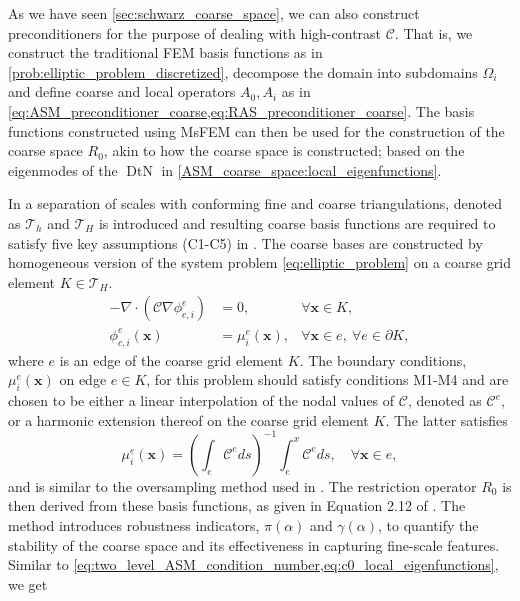 As we have seen \cref{sec:schwarz_coarse_space}, we can also construct preconditioners for the purpose of dealing with high-contrast $\mathcal{C}$. That is, we construct the traditional FEM basis functions as in \cref{prob:elliptic_problem_discretized}, decompose the domain into subdomains $\Omega_i$ and define coarse and local operators $A_0, A_i$ as in \cref{eq:ASM_preconditioner_coarse,eq:RAS_preconditioner_coarse}. The basis functions constructed using MsFEM can then be used for the construction of the coarse space $R_0$, akin to how the coarse space is constructed; based on the eigenmodes of the $\operatorname{DtN}$ in \cref{ASM_coarse_space:local_eigenfunctions}.

In \cite{msfem_coarse_space_Graham_2007,msfem_for_darcy_Efendiev2011} a separation of scales with conforming fine and coarse triangulations, denoted as $\mathcal{T}_h$ and $\mathcal{T}_H$ is introduced and resulting coarse basis functions are required to satisfy five key assumptions (C1-C5) in \cite[Section 2.2]{msfem_coarse_space_Graham_2007}. The coarse bases are constructed by homogeneous version of the system problem \cref{eq:elliptic_problem} on a coarse grid element $K\in\mathcal{T}_H$.
\begin{equation}
    \begin{aligned}
        -\nabla\cdot(\mathcal{C} \nabla \phi^e_{c,i}) & = 0,                   & \forall \mathbf{x} \in K,                             \\
        \phi^e_{c,i}(\mathbf{x})                      & = \mu^e_i(\mathbf{x}), & \forall \mathbf{x} \in e, \ \forall e \in \partial K,
    \end{aligned}
    \label{eq:msfem_coarse_basis}
\end{equation}
where $e$ is an edge of the coarse grid element $K$. The boundary conditions, $\mu^e_i(\mathbf{x})$ on edge $e\in K$, for this problem should satisfy conditions M1-M4 \cite[Section 4]{msfem_coarse_space_Graham_2007} and are chosen to be either a linear interpolation of the nodal values of $\mathcal{C}$, denoted as $\mathcal{C}^e$, or a harmonic extension thereof on the coarse grid element $K$. The latter satisfies
\begin{equation}
    \mu^e_i(\mathbf{x}) = \left(\int_e \mathcal{C}^e ds\right)^{-1}\int_e^x \mathcal{C}^e ds, \quad \forall \mathbf{x} \in e,
    \label{eq:msfem_harmonic_extension}
\end{equation}
and is similar to the oversampling method used in \cite{og_msfem_Hou1997}. The restriction operator $R_0$ is then derived from these basis functions, as given in Equation 2.12 of \cite{msfem_coarse_space_Graham_2007}. The method introduces robustness indicators, $\pi(\alpha)$ and $\gamma(\alpha)$, to quantify the stability of the coarse space and its effectiveness in capturing fine-scale features. Similar to \cref{eq:two_level_ASM_condition_number,eq:c0_local_eigenfunctions}, we get \cite[Theorem 3.9]{msfem_coarse_space_Graham_2007}
